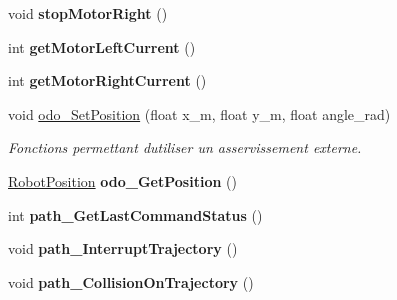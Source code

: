 \begin{DoxyCompactItemize}
\item 
\mbox{\label{classAsservDriver__LegoAngle_a540ab0538df36a90c95fc745779179ef}} 
void {\bfseries stop\+Motor\+Right} ()
\item 
\mbox{\label{classAsservDriver__LegoAngle_a2a1a8550d1e1bd03f8df2198f1ac1219}} 
int {\bfseries get\+Motor\+Left\+Current} ()
\item 
\mbox{\label{classAsservDriver__LegoAngle_aafc17f19d1f553ce21420fed5525fdeb}} 
int {\bfseries get\+Motor\+Right\+Current} ()
\item 
\mbox{\label{classAsservDriver__LegoAngle_ad02b613b86972d207eb0abed4a549b6a}} 
void \hyperlink{classAsservDriver__LegoAngle_ad02b613b86972d207eb0abed4a549b6a}{odo\+\_\+\+Set\+Position} (float x\+\_\+m, float y\+\_\+m, float angle\+\_\+rad)
\begin{DoxyCompactList}\small\item\em Fonctions permettant d\textquotesingle{}utiliser un asservissement externe. \end{DoxyCompactList}\item 
\mbox{\label{classAsservDriver__LegoAngle_a9f2a01a4f7b792842d03dc65f775e180}} 
\hyperlink{structRobotPosition}{Robot\+Position} {\bfseries odo\+\_\+\+Get\+Position} ()
\item 
\mbox{\label{classAsservDriver__LegoAngle_aa53b01ce78d0e2298646fd2e08cd85ee}} 
int {\bfseries path\+\_\+\+Get\+Last\+Command\+Status} ()
\item 
\mbox{\label{classAsservDriver__LegoAngle_a91640fd85b561c09db76605406eabed6}} 
void {\bfseries path\+\_\+\+Interrupt\+Trajectory} ()
\item 
\mbox{\label{classAsservDriver__LegoAngle_a4e4ce9ba7e2ca50fad9f333e1d8c9642}} 
void {\bfseries path\+\_\+\+Collision\+On\+Trajectory} ()
\item 
\mbox{\label{classAsservDriver__LegoAngle_ac933873a2225293513b339998d9f82ea}} 

\end{DoxyCompactItemize}

